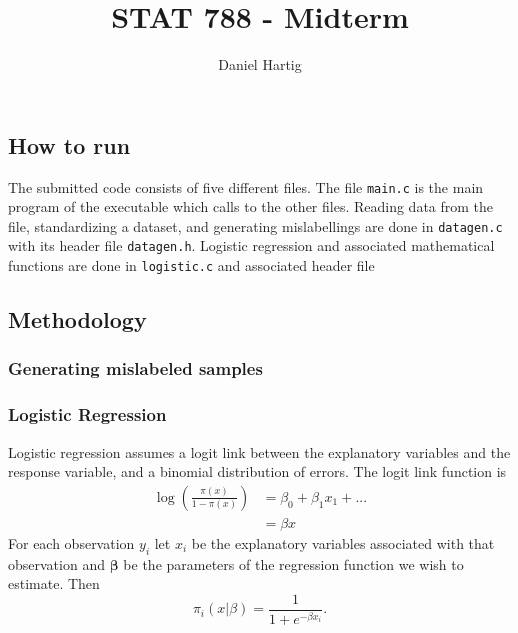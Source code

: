 \documentclass{article}
\title{STAT 788 - Midterm}
\author{Daniel Hartig}
\begin{document}
\maketitle

\subsection*{How to run}

The submitted code consists of five different files. The file \texttt{main.c} is the main program of the executable which calls to the other files. Reading data from the file, standardizing a dataset, and generating mislabellings are done in \texttt{datagen.c} with its header file \texttt{datagen.h}. Logistic regression and associated mathematical functions are done in \texttt{logistic.c} and associated header file 


\subsection*{Methodology}

\subsubsection*{Generating mislabeled samples}



\subsubsection*{Logistic Regression}
Logistic regression assumes a logit link between the explanatory variables and the response variable, and a binomial distribution of errors. The logit link function is 
\begin{align*}
\log\left(\frac{\pi(x)}{1-\pi(x)}\right) &= \beta_0 + \beta_1x_1 + ... \\
&= \beta x
\end{align*}
For each observation $y_i$ let $x_i$ be the explanatory variables associated with that observation and $\boldsymbol{\beta}$ be the parameters of the regression function we wish to estimate. Then 
$$\pi_i(x|\beta) = \frac{1}{1+e^{-\beta x_i}}.$$
\end{document}
